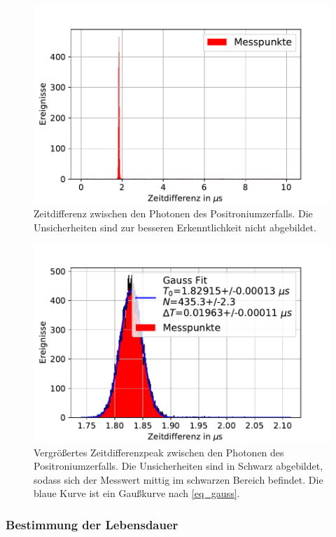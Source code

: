 \documentclass[
	a4paper,
	12pt,
	pagesize,
	ngerman
]{scrartcl}
\begin{document}
	\begin{figure}[H]
				\includegraphics[width= 0.8 \linewidth]{img/Positronium_Zeitdifferenz}
				\caption{
				Zeitdifferenz zwischen den Photonen des Positroniumzerfalls.
				Die Unsicherheiten sind zur besseren Erkenntlichkeit nicht abgebildet.
				}
				\label{fig_positronium_zeitdifferenzen}
		\end{figure}

	\begin{figure}[H]
				\includegraphics[width= 0.8 \linewidth]{img/Positronium_Zeitdifferenz_zoom}
				\caption{
				Vergrößertes Zeitdifferenzpeak zwischen den Photonen des Positroniumzerfalls.
				Die Unsicherheiten sind in Schwarz abgebildet, sodass sich der Messwert mittig im schwarzen Bereich befindet.
				Die blaue Kurve ist ein Gaußkurve nach \cref{eq_gauss}.
				}
				\label{fig_positronium_zeitdifferenzen_zoom}
		\end{figure}

		\subsubsection{Bestimmung der Lebensdauer}
\end{document}
